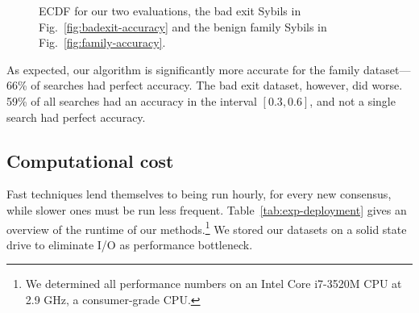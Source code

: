 \begin{figure}
\centering
{}
\caption{ECDF for our two evaluations, the bad exit Sybils
	in Fig.~\ref{fig:badexit-accuracy} and the benign family Sybils
	in Fig.~\ref{fig:family-accuracy}.}
\label{fig:accuracy}
\end{figure}

As expected, our algorithm is significantly more accurate for the family
dataset---66\% of searches had perfect accuracy.  The bad exit dataset, however,
did worse.  59\% of all searches had an accuracy in the interval $[0.3,0.6]$,
and not a single search had perfect accuracy.


\subsection{Computational cost}
\label{sec:performance}
Fast techniques lend themselves to being run hourly, for every new consensus,
while slower ones must be run less frequent.  Table~\ref{tab:exp-deployment}
gives an overview of the runtime of our methods.\footnote{We determined all
performance numbers on an Intel Core i7-3520M CPU at 2.9 GHz, a consumer-grade
CPU.}  We stored our datasets on a solid state drive to eliminate I/O as
performance bottleneck.

